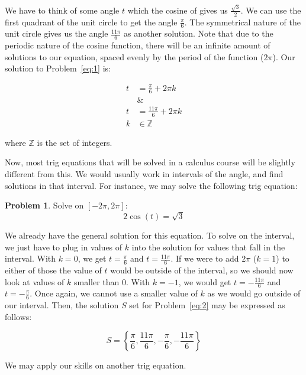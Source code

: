 \documentclass[12pt]{article}
\theoremstyle{definition}
\newtheorem{problem}{Problem}
\begin{document}
We have to think of some angle $t$ which the cosine of gives us $\frac{\sqrt{3}}{2}$.
We can use the first quadrant of the unit circle to get the angle $\frac{\pi}{6}$.
The symmetrical nature of the unit circle gives us the angle $\frac{11\pi}{6}$ as another solution.
Note that due to the periodic nature of the cosine function, there will be an infinite amount of solutions to our equation, spaced evenly by the period of the function ($2\pi$).
Our solution to Problem~\eqref{eq:1} is:

\begin{align}
    t & = \frac{\pi}{6} + 2\pi k   \\
      & \&                         \\
    t & = \frac{11\pi}{6} + 2\pi k \\
    k & \in \mathbb{Z}
\end{align}

where $\mathbb{Z}$ is the set of integers.

Now, most trig equations that will be solved in a calculus course will be slightly different from this.
We would usually work in intervals of the angle, and find solutions in that interval.
For instance, we may solve the following trig equation:


\begin{problem}
Solve on $\displaystyle [-2\pi, 2\pi]$:
\begin{equation*}
    {2\cos(t) = \sqrt{3}} \label{eq:2}
\end{equation*}
\end{problem}

We already have the general solution for this equation.
To solve on the interval, we just have to plug in values of $k$ into the solution for values that fall in the interval.
With $k=0$, we get $t=\frac{\pi}{6}$ and $t=\frac{11\pi}{6}$.
If we were to add $2\pi$ ($k=1$) to either of those the value of $t$ would be outside of the interval, so we should now look at values of $k$ smaller than $0$.
With $k=-1$, we would get $t=-\frac{11\pi}{6}$ and $t=-\frac{\pi}{6}$.
Once again, we cannot use a smaller value of $k$ as we would go outside of our interval.
Then, the solution $S$ set for Problem~\eqref{eq:2} may be expressed as follows:

\begin{equation}
    S = \left\{ \frac{\pi}{6}, \frac{11\pi}{6}, -\frac{\pi}{6}, -\frac{11\pi}{6} \right\}
\end{equation}

We may apply our skills on another trig equation.
\end{document}
